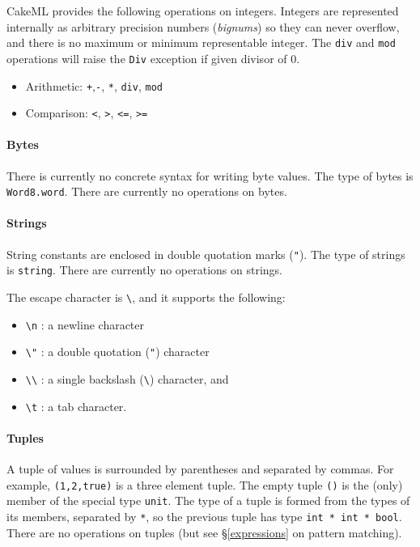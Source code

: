 \documentclass{article}
\begin{document}
CakeML provides the following operations on integers. Integers are represented internally as arbitrary precision numbers (\emph{bignums}) so they can never overflow, and there is no maximum or minimum representable integer. The \texttt{div} and \texttt{mod} operations will raise the \texttt{Div} exception if given divisor of 0.
\begin{itemize}
\item Arithmetic: \texttt{+},\texttt{-}, \texttt{*}, \texttt{div}, \texttt{mod}
\item Comparison: \texttt{<}, \texttt{>}, \texttt{<=}, \texttt{>=}
\end{itemize}

\paragraph{Bytes} There is currently no concrete syntax for writing byte values. The type of bytes is \texttt{Word8.word}. There are currently no operations on bytes.

\paragraph{Strings} String constants are enclosed in double quotation marks (\texttt{"}). The type of strings is \texttt{string}. There are currently no operations on strings.

The escape character is \verb|\|, and it supports the following:
\begin{itemize}
\item
\verb|\n| : a newline character
\item 
\verb|\"| : a double quotation (\texttt{"}) character
\item
\verb|\\| : a single backslash (\verb|\|) character, and
\item 
\verb|\t| : a tab character.
\end{itemize}

\paragraph{Tuples} A tuple of values is surrounded by parentheses and separated by commas. For example, \texttt{(1,2,true)} is a three element tuple. The empty tuple \texttt{()} is the (only) member of the special type \texttt{unit}. The type of a tuple is formed from the types of its members, separated by \texttt{*}, so the previous tuple has type \texttt{int * int * bool}. There are no operations on tuples (but see \S\ref{expressions} on pattern matching).
\end{document}

